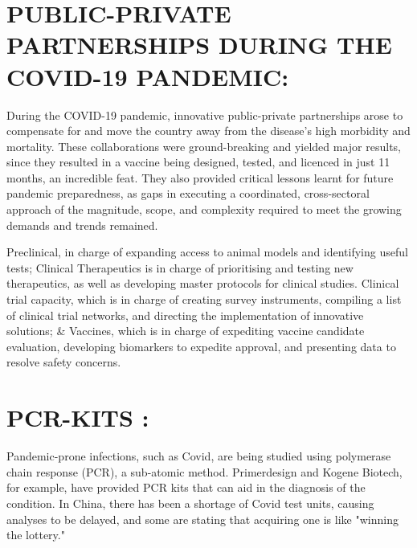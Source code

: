 \documentclass[12pt]{article}
\begin{document}
\section{PUBLIC-PRIVATE PARTNERSHIPS DURING THE COVID-19 PANDEMIC:}

During the COVID-19 pandemic, innovative public-private partnerships arose to compensate for and move the country away from the disease's high morbidity and mortality. These collaborations were ground-breaking and yielded major results, since they resulted in a vaccine being designed, tested, and licenced in just 11 months, an incredible feat. They also provided critical lessons learnt for future pandemic preparedness, as gaps in executing a coordinated, cross-sectoral approach of the magnitude, scope, and complexity required to meet the growing demands and trends remained.

Preclinical, in charge of expanding access to animal models and identifying useful tests;
Clinical Therapeutics is in charge of prioritising and testing new therapeutics, as well as developing master protocols for clinical studies.
Clinical trial capacity, which is in charge of creating survey instruments, compiling a list of clinical trial networks, and directing the implementation of innovative solutions; & Vaccines, which is in charge of expediting vaccine candidate evaluation, developing biomarkers to expedite approval, and presenting data to resolve safety concerns.


\section{PCR-KITS :}

Pandemic-prone infections, such as Covid, are being studied using polymerase chain response (PCR), a sub-atomic method. Primerdesign and Kogene Biotech, for example, have provided PCR kits that can aid in the diagnosis of the condition. In China, there has been a shortage of Covid test units, causing analyses to be delayed, and some are stating that acquiring one is like "winning the lottery."
\end{document}
